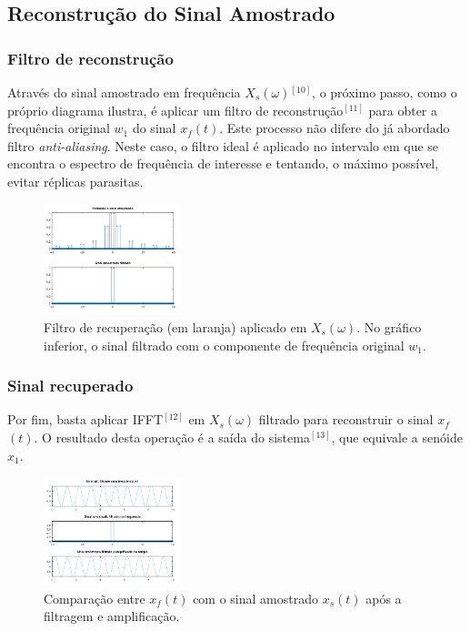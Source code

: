 \documentclass[journal]{IEEEtran}
\begin{document}
\subsection{Reconstrução do Sinal Amostrado}

\subsubsection{Filtro de reconstrução}

Através do sinal amostrado em frequência $X$$_s$$(\omega)$$^{[10]}$, o próximo passo, como o próprio diagrama ilustra, é aplicar um filtro de reconstrução$^{[11]}$ para obter a frequência original $w$$_1$ do sinal $x$$_f$$(t)$. Este processo não difere do já abordado filtro \textit{anti-aliasing}. Neste caso, o filtro ideal é aplicado no intervalo em que se encontra o espectro de frequência de interesse e tentando, o máximo possível, evitar réplicas parasitas.

\begin{figure}[H]
\captionsetup{justification=centering}
\centering %
\includegraphics[width=4cm]{ex_filtrando_amostr.png} %
\caption{Filtro de recuperação (em laranja) aplicado em $X$$_s$$(\omega)$. No gráfico inferior, o sinal filtrado com o componente de frequência original $w$$_1$.}
\end{figure}

\subsubsection{Sinal recuperado}

Por fim, basta aplicar IFFT$^{[12]}$ em $X$$_s$$(\omega)$ filtrado para reconstruir o sinal $x$$_f$$(t)$. O resultado desta operação é a saída do sistema$^{[13]}$, que equivale a senóide $x$$_1$.

\begin{figure}[H]
\captionsetup{justification=centering}
\centering %
\includegraphics[width=4cm]{ex_amplificando_amostr.png} %
\caption{Comparação entre $x$$_f$$(t)$ com o sinal amostrado $x$$_s$$(t)$ após a filtragem e amplificação.}
\end{figure}
\end{document}
